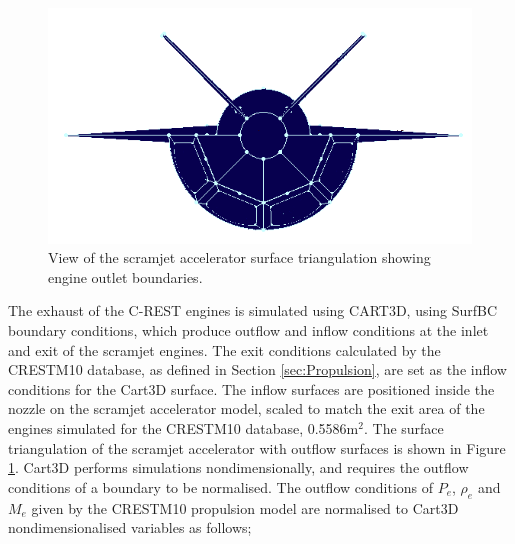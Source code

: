 \begin{figure}[ht]
	\centering
	\includegraphics[width=0.7\linewidth]{figures/3_vehicle_design/Pointwise-EngineBC}
	\caption{View of the scramjet accelerator surface triangulation showing engine outlet boundaries.}
	\label{fig:Pointwise-EngineBC}
\end{figure}
The exhaust of the C-REST engines is simulated using CART3D, using SurfBC boundary conditions, which produce outflow and inflow conditions at the inlet and exit of the scramjet engines\cite{Pandya2004}. The exit conditions calculated by the \textsf{CRESTM10} database, as defined in Section \ref{sec:Propulsion}, are set as the inflow conditions for the Cart3D surface. 
The inflow surfaces are positioned inside the nozzle on the scramjet accelerator model, scaled to match the exit area of the engines simulated for the \textsf{CRESTM10} database, 0.5586m$^2$. The surface triangulation of the scramjet accelerator with outflow surfaces is shown in Figure \ref{fig:Pointwise-EngineBC}.
Cart3D performs simulations nondimensionally, and requires the outflow conditions of a boundary to be normalised. The outflow conditions of $P_e$, $\rho_e$ and $M_e$ given by the \textsf{CRESTM10 }propulsion model are normalised to Cart3D nondimensionalised variables as follows\cite{Cartplumes,Mehta2015};

